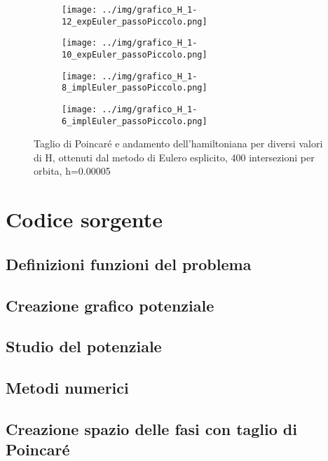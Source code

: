 \documentclass[a4paper, 12pt]{article}
\numberwithin{equation}{section}
\numberwithin{figure}{section}
\begin{document}
\begin{figure}[h!]
	\centering
	\begin{subfigure}[t]{.49\textwidth}
		\centering
		\texttt{[image: ../img/grafico\_H\_1-12\_expEuler\_passoPiccolo.png]}
	\end{subfigure}
	\begin{subfigure}[t]{.49\textwidth}
		\centering
		\texttt{[image: ../img/grafico\_H\_1-10\_expEuler\_passoPiccolo.png]}
	\end{subfigure}
	\begin{subfigure}[t]{.49\textwidth}
		\centering
		\texttt{[image: ../img/grafico\_H\_1-8\_implEuler\_passoPiccolo.png]}
	\end{subfigure}
	\begin{subfigure}[t]{.49\textwidth}
		\centering
		\texttt{[image: ../img/grafico\_H\_1-6\_implEuler\_passoPiccolo.png]}
	\end{subfigure}

	\caption{Taglio di Poincaré e andamento dell'hamiltoniana per diversi valori di H,
	ottenuti dal metodo di Eulero esplicito, 400 intersezioni per orbita, h=0.00005}
	\label{img:euleroesplicitopiccolo}
\end{figure}

\clearpage
\section{Codice sorgente}
\subsection{Definizioni funzioni del problema}


\subsection{Creazione grafico potenziale}

\clearpage

\subsection{Studio del potenziale}

\clearpage

\subsection{Metodi numerici}



\clearpage

\subsection{Creazione spazio delle fasi con taglio di Poincaré}


\clearpage
\printbibliography
\end{document}
